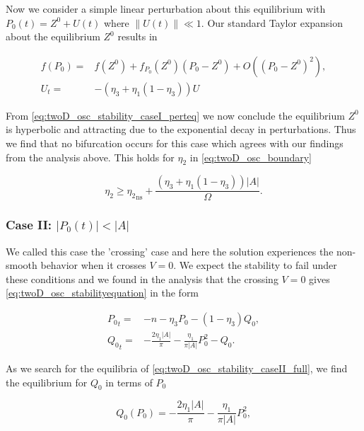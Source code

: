Now we consider a simple linear perturbation about this equilibrium with $P_0(t)= Z^0+U(t)$ where $\lVert U(t) \rVert \ll 1$. Our standard Taylor expansion about the equilibrium $Z^0$ results in

\begin{equation}\label{eq:twoD_osc_stability_caseI_perteq}
\begin{aligned}
f(P_0)=&f(Z^0)+f_{P_0}(Z^0)(P_0-Z^0)+O((P_0-Z^0)^2),\\
U_t =& -(\eta_3+\eta_1(1-\eta_3))U
\end{aligned}
\end{equation}

From \eqref{eq:twoD_osc_stability_caseI_perteq} we now conclude the equilibrium $Z^0$ is hyperbolic and attracting due to the exponential decay in perturbations. Thus we find that no bifurcation occurs for this case which agrees with our findings from the analysis above. This holds for $\eta_2$ in \eqref{eq:twoD_osc_boundary}

\begin{equation*}
\eta_2 \ge {\eta_2}_{\text{ns}} +\frac{(\eta_3+\eta_1(1-\eta_3))|A|}{\Omega}.
\end{equation*}


\subsubsection{Case II: $|P_0(t)|<|A|$}

We called this case the 'crossing' case and here the solution experiences the non-smooth behavior when it crosses $V=0$. We expect the stability to fail under these conditions and we found in the analysis that the crossing $V=0$ gives \eqref{eq:twoD_osc_stabilityequation} in the form

\begin{equation}\label{eq:twoD_osc_stability_caseII_full}
\begin{aligned}
{P_0}_t =& -n-\eta_3 P_0-(1-\eta_3)Q_0,\\
{Q_0}_t =& -\frac{2\eta_1|A|}{\pi}-\frac{\eta_1}{\pi |A|}P_0^2-Q_0.
\end{aligned}
\end{equation}

As we search for the equilibria of \eqref{eq:twoD_osc_stability_caseII_full}, we find the equilibrium for $Q_0$ in terms of $P_0$ 

\begin{equation*}
Q_0(P_0)=-\frac{2\eta_1|A|}{\pi}-\frac{\eta_1}{\pi |A|}P_0^2,
\end{equation*}

